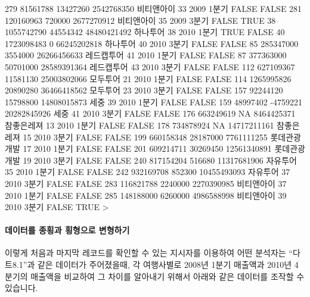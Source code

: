 \documentclass[tutorial.tex]{subfiles}
\begin{document}
\begin{Schunk}
\begin{Soutput}
279   81561788   13427260  2542768350   비티앤아이   33 2009 1분기 FALSE FALSE
281  120160963     720000  2677270912   비티앤아이   35 2009 3분기 FALSE  TRUE
38  1055742790   44554342 48480421492     하나투어   38 2010 1분기  TRUE FALSE
40  1723098483          0 66245202818     하나투어   40 2010 3분기 FALSE FALSE
85   285347000    3554000 26266456633   레드캡투어   41 2010 1분기 FALSE FALSE
87   377363000   50701000 28589391364   레드캡투어   43 2010 3분기 FALSE FALSE
112  627109367   11581130 25003802066     모두투어   21 2010 1분기 FALSE FALSE
114 1265995826   20890280 36466418562     모두투어   23 2010 3분기 FALSE FALSE
157   92244120   15798800 14808015873         세중   39 2010 1분기 FALSE FALSE
159   48997402   -4759221 20282845926         세중   41 2010 3분기 FALSE FALSE
176  663249619         NA  8464425371   참좋은레져   13 2010 1분기 FALSE FALSE
178  734878924         NA 14717211161   참좋은레져   15 2010 3분기 FALSE FALSE
199  660158348   28187000  7761111255 롯데관광개발   17 2010 1분기 FALSE FALSE
201  609214711   30269450 12561340891 롯데관광개발   19 2010 3분기 FALSE FALSE
240  817154204     516680 11317681906     자유투어   35 2010 1분기 FALSE FALSE
242  932169708     852300 10455493093     자유투어   37 2010 3분기 FALSE FALSE
283  116821788    2240000  2270390985   비티앤아이   37 2010 1분기 FALSE FALSE
285  148188000    6260000  4986588998   비티앤아이   39 2010 3분기 FALSE  TRUE
> 
\end{Soutput}
\end{Schunk}

\paragraph{데이터를 종횡과 횡형으로 변형하기}
이렇게 처음과 마지막 레코드를 확인할 수 있는 지시자를 이용하여 어떤 분석자는 ``다트8.1''과 같은 데이터가 주어졌을때, 각 여행사별로 2008년 1분기 매출액과 2010년 4분기의 매출액을 비교하여 그 차이를 알아내기 위해서 아래와 같은 데이터를 조작할 수 있습니다.
\end{document}
